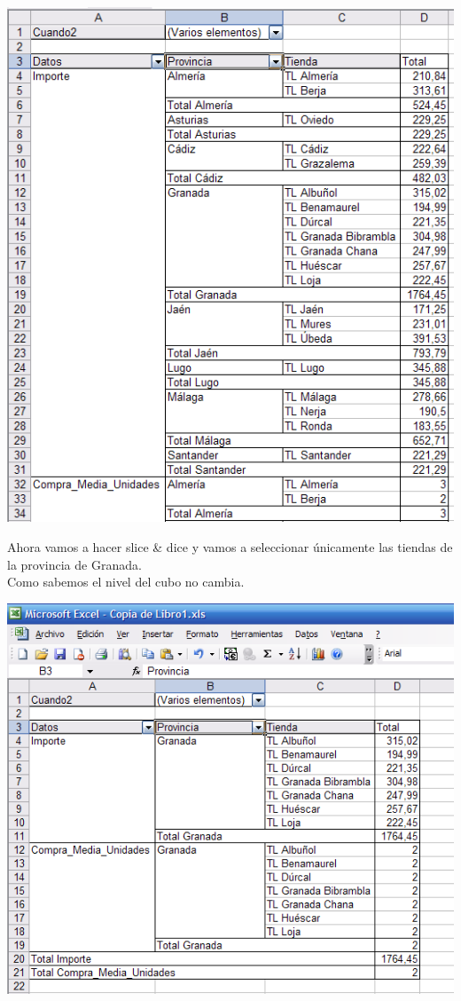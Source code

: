 \documentclass[paper=a4, fontsize=11pt, spanish]{scrartcl}
\numberwithin{equation}{section} %
\numberwithin{figure}{section} %
\numberwithin{table}{section} %
\begin{document}
\begin{center}
	\includegraphics[scale=0.75]{drillDown.png}
\end{center}

Ahora vamos a hacer slice \& dice y vamos a seleccionar únicamente las tiendas de la provincia de Granada.\\
Como sabemos el nivel del cubo no cambia.
\begin{center}
	\includegraphics[scale=0.75]{slice&dice.png}
\end{center}
	
\end{document}
